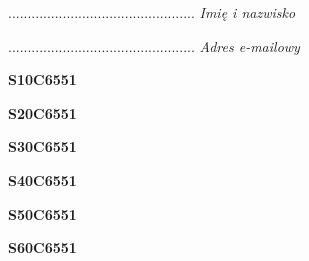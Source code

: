 \begin{turn}{90}\begin{minipage}{\linewidth} \vspace{20mm} ................................................  \textit{Imię i nazwisko}\end{minipage}\end{turn}

\begin{turn}{90}\begin{minipage}{\linewidth} \vspace{20mm} ................................................  \textit{Adres e-mailowy}\end{minipage}\end{turn}

\begin{turn}{90}\huge \begin{minipage}{\linewidth} \vspace{10mm}\textbf{S10C6551}\end{minipage}\end{turn}

\begin{turn}{90}\huge \begin{minipage}{\linewidth} \vspace{10mm}\textbf{S20C6551}\end{minipage}\end{turn}

\begin{turn}{90}\huge \begin{minipage}{\linewidth} \vspace{10mm}\textbf{S30C6551}\end{minipage}\end{turn}

\begin{turn}{90}\huge \begin{minipage}{\linewidth} \vspace{10mm}\textbf{S40C6551}\end{minipage}\end{turn}

\begin{turn}{90}\huge \begin{minipage}{\linewidth} \vspace{10mm}\textbf{S50C6551}\end{minipage}\end{turn}

\begin{turn}{90}\huge \begin{minipage}{\linewidth} \vspace{10mm}\textbf{S60C6551}\end{minipage}\end{turn}

